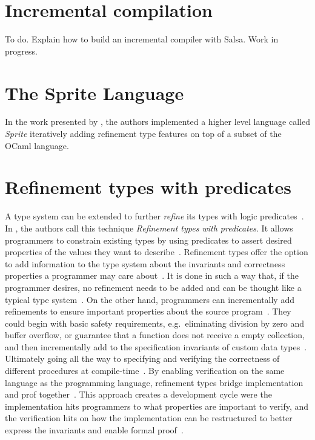 \documentclass[
    oneside,
    english,
    coorientadorbanca,
    embeddedlogo,
    noabntexcite
]{ufsc-thesis-rn46-2019}
\begin{document}
\section{Incremental compilation}

To do. Explain how to build an incremental compiler with Salsa. Work in progress.

\section{The Sprite Language}

In the work presented by \textcite{jhala2020tutorial}, the authors implemented a higher level language called \textit{Sprite} iteratively adding refinement type features on top of a subset of the OCaml language.

\section{Refinement types with predicates}

A type system can be extended to further \textit{refine} its types with logic predicates~\cite{jhala2020tutorial}.
In \textcite{jhala2020tutorial}, the authors call this technique \textit{Refinement types with predicates}.
It allows programmers to constrain existing types by using predicates to assert desired properties of the values they want to describe~\cite{jhala2020tutorial}.
Refinement types offer the option to add information to the type system about the invariants and correctness properties a programmer may care about~\cite{jhala2020tutorial}.
It is done in such a way that, if the programmer desires, no refinement needs to be added and can be thought like a typical type system~\cite{jhala2020tutorial}.
On the other hand, programmers can incrementally add refinements to ensure important properties about the source program~\cite{jhala2020tutorial}.
They could begin with basic safety requirements, e.g.\ eliminating division by zero and buffer overflow, or guarantee that a function does not receive a empty collection, and then incrementally add to the specification invariants of custom data types~\cite{jhala2020tutorial}.
Ultimately going all the way to specifying and verifying the correctness of different procedures at compile-time~\cite{jhala2020tutorial}.
By enabling verification on the same language as the programming language, refinement types bridge implementation and prof together~\cite{jhala2020tutorial}.
This approach creates a development cycle were the implementation hits programmers to what properties are important to verify, and the verification hits on how the implementation can be restructured to better express the invariants and enable formal proof~\cite{jhala2020tutorial}.
\end{document}
